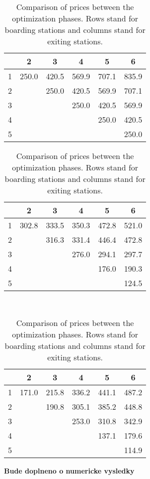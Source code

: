 \begin{table}[t]
	\centering
	
	\begin{subtable}[b]{0.49\textwidth}
    \centering
			\begin{tabular}{cccccc}
				\hline
					& 2 & 3 & 4 & 5 & 6 \\ 
				\hline
				1 & 250.0 & 420.5 & 569.9 & 707.1 & 835.9 \\ 
				2 &  & 250.0 & 420.5 & 569.9 & 707.1 \\ 
				3 &  &  & 250.0 & 420.5 & 569.9 \\ 
				4 &  &  &  & 250.0 & 420.5 \\ 
				5 &  &  &  &  & 250.0 \\ 
				 \hline
			\end{tabular}
    \caption{Initial prices.}
  \end{subtable}
	\hfill
	\begin{subtable}[b]{0.49\textwidth}
    \centering
			\begin{tabular}{cccccc}
				\hline
				 & 2 & 3 & 4 & 5 & 6 \\ 
				\hline
				1 & 302.8 & 333.5 & 350.3 & 472.8 & 521.0 \\ 
				2 &  & 316.3 & 331.4 & 446.4 & 472.8 \\ 
				3 &  &  & 276.0 & 294.1 & 297.7 \\ 
				4 &  &  &  & 176.0 & 190.3 \\ 
				5 &  &  &  &  & 124.5 \\ 
				 \hline
			\end{tabular}
    \caption{Cross Entropy.}
  \end{subtable}
	
	\\
	
	\begin{subtable}[b]{0.49\textwidth}
    \centering
			\begin{tabular}{cccccc}
				\hline
				 & 2 & 3 & 4 & 5 & 6 \\ 
				\hline
				1 & 171.0 & 215.8 & 336.2 & 441.1 & 487.2 \\ 
				2 &  & 190.8 & 305.1 & 385.2 & 448.8 \\ 
				3 &  &  & 253.0 & 310.8 & 342.9 \\ 
				4 &  &  &  & 137.1 & 179.6 \\ 
				5 &  &  &  &  & 114.9 \\ 
				 \hline
			\end{tabular}    
		\caption{Response Surface.}
  \end{subtable}
	\hfill
	\begin{subtable}[b]{0.49\textwidth}
    \centering
			\textbf{\color{red} Bude doplneno o numericke vysledky}  
		\caption{Dynamic pricing.}
  \end{subtable}

	\caption{Comparison of prices between the optimization phases. Rows stand for boarding stations and columns stand for exiting stations.}
	\label{tab:priceSolutions}
\end{table}

